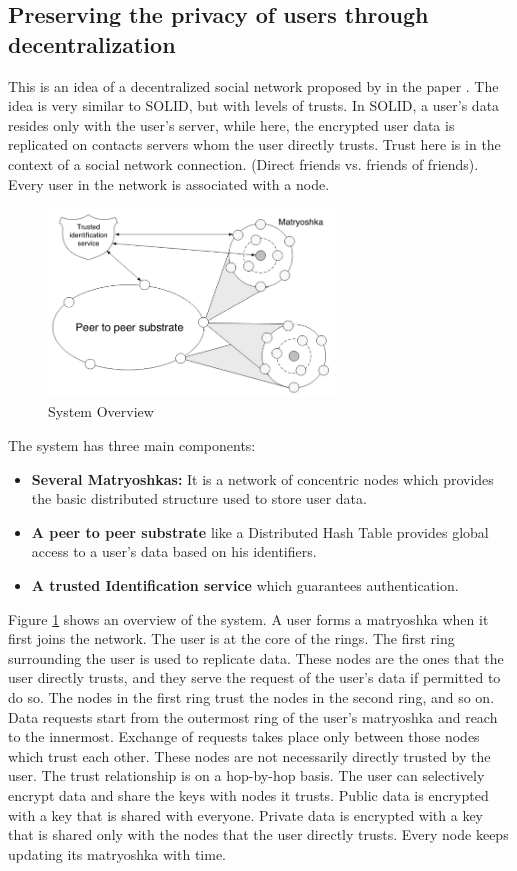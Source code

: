 \documentclass[12pt, conference, a4paper]{article}
\begin{document}
\subsection{Preserving the privacy of users through decentralization}
This is an idea of a decentralized social network proposed by \citeauthor{4801860} in the paper  \cite{4801860}. The idea is very similar to SOLID, but with levels of trusts. In SOLID, a user's data resides only with the user's server, while here, the encrypted user data is replicated on contacts servers whom the user directly trusts. Trust here is in the context of a social network connection. (Direct friends vs. friends of friends). Every user in the network is associated with a node.\\
\begin{figure}[H]
\begin{center}
  \includegraphics[width=3in]{matryoshka.png}
\caption{System Overview \cite{4801860}}
\label{fig: matryoshka} 
\end{center}
\end{figure}
The system has three main components:
\begin{itemize}
\item \textbf{Several Matryoshkas:} It is a network of concentric nodes which provides the basic distributed structure used to store user data.
\item \textbf{A peer to peer substrate} like a Distributed Hash Table provides global access to a user's data based on his identifiers.
\item \textbf{A trusted Identification service} which guarantees authentication.
\end{itemize}
Figure \ref{fig: matryoshka} shows an overview of the system.
A user forms a matryoshka when it first joins the network. The user is at the core of the rings. The first ring surrounding the user is used to replicate data. These nodes are the ones that the user directly trusts, and they serve the request of the user's data if permitted to do so. The nodes in the first ring trust the nodes in the second ring, and so on. Data requests start from the outermost ring of the user's matryoshka and reach to the innermost. Exchange of requests takes place only between those nodes which trust each other. These nodes are not necessarily directly trusted by the user. The trust relationship is on a hop-by-hop basis. The user can selectively encrypt data and share the keys with nodes it trusts. Public data is encrypted with a key that is shared with everyone. Private data is encrypted with a key that is shared only with the nodes that the user directly trusts. Every node keeps updating its matryoshka with time.\\
\end{document}
